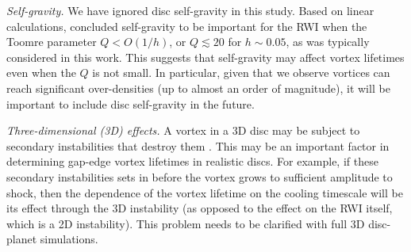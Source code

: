 \emph{Self-gravity.} We have ignored disc self-gravity in this
study. Based on linear calculations, \cite{lovelace13} concluded
self-gravity to be important for the RWI when the Toomre parameter $Q<O(1/h)$, or
$Q\lesssim 20$ for $h\sim0.05$, as was typically considered in this
work. This suggests that self-gravity may affect vortex lifetimes even
when the $Q$ is not small. In particular, given that
we observe vortices can reach significant over-densities (up to almost
an order of magnitude), it will be important to include disc
self-gravity in the future. %
 
\emph{Three-dimensional (3D) effects.} A vortex in a 3D disc may be
subject to secondary instabilities that destroy them
\citep{lesur09,railton14}. This may be an important factor in
determining gap-edge vortex lifetimes in realistic discs. For example,
if these secondary instabilities sets in before the vortex grows to
sufficient amplitude to shock, then the dependence of the vortex
lifetime on the cooling timescale will be its effect through the 3D
instability (as opposed to the effect on the RWI itself, which is a 2D
instability). This problem needs to be clarified with full 3D
disc-planet simulations.  

